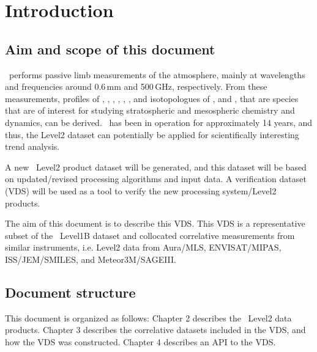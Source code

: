 \chapter{Introduction}
\label{chapter:introduction}


\setcounter{page}{1}


\section{Aim and scope of this document}
\label{sec:aim}
\smr\ performs passive limb measurements of the atmosphere,
mainly at wavelengths and frequencies around 0.6\,mm and 500\,GHz,
respectively.
From these measurements, profiles of 
, , , , 
, , and isotopologues of , and ,
that are species that are of interest for studying stratospheric and 
mesospheric chemistry and dynamics, can be derived. 
\smr\ has been in operation for approximately 14 years, and thus, the Level2
dataset can potentially be applied for scientifically interesting trend analysis.

A new \smr\ Level2 product dataset will be generated, and this dataset will be based
on updated/revised processing algorithms and input data.
A verification dataset (VDS) will be used as a tool to verify the new 
processing system/Level2 products.

The aim of this document is to describe this VDS.
This VDS is a representative subset of the \smr\ Level1B dataset
and collocated correlative measurements from similar
instruments, i.e. Level2 data from Aura/MLS, ENVISAT/MIPAS,
ISS/JEM/SMILES, and Meteor3M/SAGEIII.   


\section{Document structure}

This document is organized as follows:
Chapter 2 describes the \smr\ Level2 data products.
Chapter 3 describes the correlative datasets
included in the VDS, and how the VDS was constructed.
Chapter 4 describes an API to the VDS.

